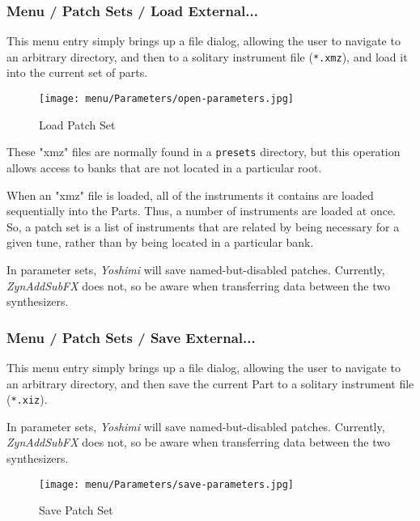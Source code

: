 \subsubsection{Menu / Patch Sets / Load External...}
\label{subsubsec:menu_patch_sets_load}

   This menu entry simply brings up a file dialog, allowing the user to
   navigate to an arbitrary directory, and then to a solitary instrument file
   (\texttt{*.xmz}), and load it into the current set of parts.

\begin{figure}[H]
   \centering 
   \texttt{[image: menu/Parameters/open-parameters.jpg]}
   \caption{Load Patch Set}
   \label{fig:yoshimi_menu_open_parameters}
\end{figure}

   These "xmz" files are normally found in a \texttt{presets} directory, but this
   operation allows access to banks that are not located in a particular root.

   When an "xmz" file is loaded, all of the instruments it contains are
   loaded sequentially into the Parts.  Thus, a number of instruments are loaded
   at once.  So, a patch set is a list of instruments that are related by
   being necessary for a given tune, rather than by being located in a
   particular bank.

   In parameter sets, \textsl{Yoshimi} will save named-but-disabled patches.
   Currently, \textsl{ZynAddSubFX} does not, so be aware when transferring
   data between the two synthesizers.

\subsubsection{Menu / Patch Sets / Save External...}
\label{subsubsec:menu_patch_sets_save}

   This menu entry simply brings up a file dialog, allowing the user to
   navigate to an arbitrary directory, and then save the current Part
   to a solitary instrument file (\texttt{*.xiz}).

   In parameter sets, \textsl{Yoshimi} will save named-but-disabled patches.
   Currently, \textsl{ZynAddSubFX} does not, so be aware when transferring
   data between the two synthesizers.

\begin{figure}[H]
   \centering 
   \texttt{[image: menu/Parameters/save-parameters.jpg]}
   \caption{Save Patch Set}
   \label{fig:yoshimi_menu_save_parameters}
\end{figure}

